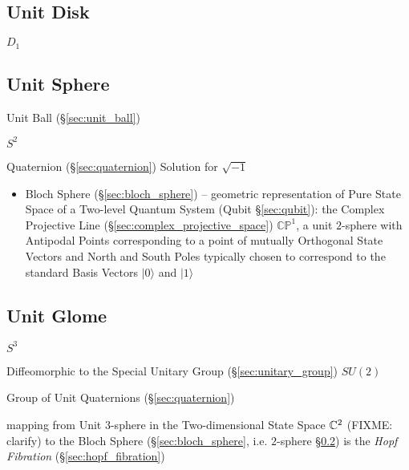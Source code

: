 \subsection{Unit Disk}\label{sec:unit_disk}

$D_1$



\subsection{Unit Sphere}\label{sec:unit_sphere}

Unit Ball (\S\ref{sec:unit_ball})

$S^2$

Quaternion (\S\ref{sec:quaternion}) Solution for $\sqrt{-1}$

\begin{itemize}
  \item Bloch Sphere (\S\ref{sec:bloch_sphere}) -- geometric representation of
    Pure State Space of a Two-level Quantum System (Qubit \S\ref{sec:qubit}):
    the Complex Projective Line (\S\ref{sec:complex_projective_space})
    $\mathbb{CP}^1$, a unit $2$-sphere with Antipodal Points corresponding to a
    point of mutually Orthogonal State Vectors and North and South Poles
    typically chosen to correspond to the standard Basis Vectors $|0\rangle$ and
    $|1\rangle$
\end{itemize}



\subsection{Unit Glome}\label{sec:unit_glome}

$S^3$

Diffeomorphic to the Special Unitary Group (\S\ref{sec:unitary_group}) $SU(2)$

Group of Unit Quaternions (\S\ref{sec:quaternion})

mapping from Unit $3$-sphere in the Two-dimensional State Space $\mathbb{C}^2$
(FIXME: clarify) to the Bloch Sphere (\S\ref{sec:bloch_sphere}, i.e. $2$-sphere
\S\ref{sec:unit_sphere}) is the \emph{Hopf Fibration}
(\S\ref{sec:hopf_fibration})



